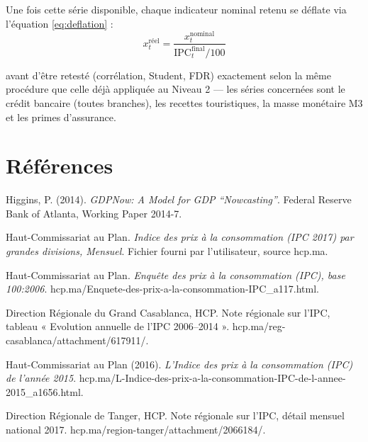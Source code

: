 \documentclass[11pt,a4paper]{article}
\begin{document}
Une fois cette série disponible, chaque indicateur nominal retenu se déflate via l'équation \ref{eq:deflation} :
\begin{equation}
x_t^{\text{réel}} = \frac{x_t^{\text{nominal}}}{\text{IPC}_t^{\text{final}} / 100}
\end{equation}

avant d'être retesté (corrélation, Student, FDR) exactement selon la même procédure que celle déjà appliquée au Niveau 2 --- les séries concernées sont le crédit bancaire (toutes branches), les recettes touristiques, la masse monétaire M3 et les primes d'assurance.

\section*{Références}
\begin{enumerate}[leftmargin=1.6em, label=\textbf{[\arabic*]}]
\item \hypertarget{ref1}{} Higgins, P. (2014). \textit{GDPNow: A Model for GDP ``Nowcasting''}. Federal Reserve Bank of Atlanta, Working Paper 2014-7.
\item \hypertarget{ref2}{} Haut-Commissariat au Plan. \textit{Indice des prix à la consommation (IPC 2017) par grandes divisions, Mensuel}. Fichier fourni par l'utilisateur, source hcp.ma.
\item \hypertarget{ref3}{} Haut-Commissariat au Plan. \textit{Enquête des prix à la consommation (IPC), base 100:2006}. hcp.ma/Enquete-des-prix-a-la-consommation-IPC\_a117.html.
\item \hypertarget{ref4}{} Direction Régionale du Grand Casablanca, HCP. Note régionale sur l'IPC, tableau « Evolution annuelle de l'IPC 2006--2014 ». hcp.ma/reg-casablanca/attachment/617911/.
\item \hypertarget{ref5}{} Haut-Commissariat au Plan (2016). \textit{L'Indice des prix à la consommation (IPC) de l'année 2015}. hcp.ma/L-Indice-des-prix-a-la-consommation-IPC-de-l-annee-2015\_a1656.html.
\item \hypertarget{ref6}{} Direction Régionale de Tanger, HCP. Note régionale sur l'IPC, détail mensuel national 2017. hcp.ma/region-tanger/attachment/2066184/.
\end{enumerate}
\end{document}
